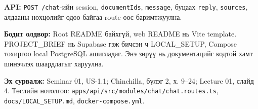 \documentclass[11pt,a4paper]{article}
\newcommand{\pathref}[1]{\nolinkurl{#1}}
\begin{document}
\textbf{API:} \pathref{POST /chat}-ийн session, \pathref{documentIds}, \pathref{message}, буцаах \pathref{reply}, \pathref{sources}, алдааны нөхцөлийг одоо байгаа route-оос баримтжуулна.

\textbf{Бодит олдвор:} Root README байхгүй, web README нь Vite template. PROJECT\_BRIEF нь Supabase гэж бичсэн ч LOCAL\_SETUP, Compose тохиргоо local PostgreSQL ашигладаг. Энэ зөрүү нь документацийг кодтой хамт шинэчлэх шаардлагыг харуулна.

\textbf{Эх сурвалж:} Seminar 01, US-1.1; Chinchilla, бүлэг 2, х. 9--24; Lecture 01, слайд 4. Төслийн нотолгоо: \pathref{apps/api/src/modules/chat/chat.routes.ts}, \pathref{docs/LOCAL_SETUP.md}, \pathref{docker-compose.yml}.
\end{document}
